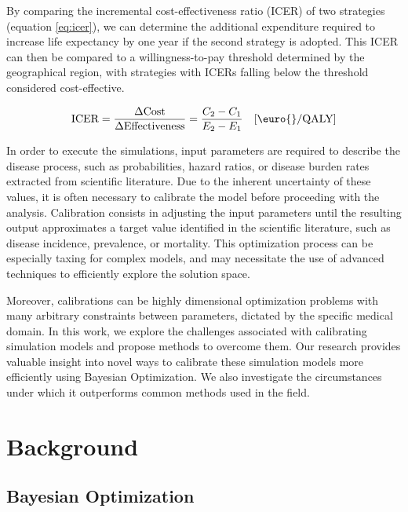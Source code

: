 \documentclass{IOS-Book-Article}
\begin{document}
	By comparing the incremental cost-effectiveness ratio (ICER) of two strategies (equation \ref{eq:icer}), we can determine the additional expenditure required to increase life expectancy by one year if the second strategy is adopted\cite{drummond}. This ICER can then be compared to a willingness-to-pay threshold determined by the geographical region, with strategies with ICERs falling below the threshold considered cost-effective.
	
	\begin{equation}
		\label{eq:icer}
		\textnormal{ICER}=\frac{\Delta \textrm{Cost}}{\Delta \textrm{Effectiveness}} = \frac{C_2-C_1}{E_2-E_1} \quad [\euro{}/\textrm{QALY}]
	\end{equation}
	
	In order to execute the simulations, input parameters are required to describe the disease process, such as probabilities, hazard ratios, or disease burden rates extracted from scientific literature. Due to the inherent uncertainty of these values, it is often necessary to calibrate the model before proceeding with the analysis. Calibration consists in adjusting the input parameters until the resulting output approximates a target value identified in the scientific literature, such as disease incidence, prevalence, or mortality. This optimization process can be especially taxing for complex models, and may necessitate the use of advanced techniques to efficiently explore the solution space.
	
	Moreover, calibrations can be highly dimensional optimization problems with many arbitrary constraints between parameters, dictated by the specific medical domain. In this work, we explore the challenges associated with calibrating simulation models and propose methods to overcome them. Our research provides valuable insight into novel ways to calibrate these simulation models more efficiently using Bayesian Optimization. We also investigate the circumstances under which it outperforms common methods used in the field.	
	
	
	\section{Background}
	
	\subsection{Bayesian Optimization}
	
\end{document}
